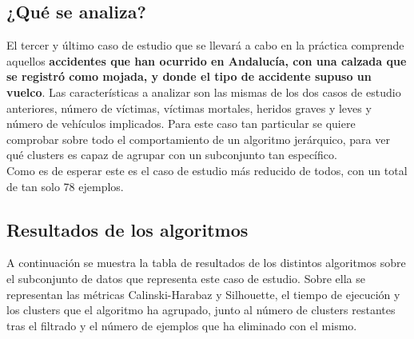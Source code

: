 	\subsection{¿Qué se analiza?}
	El tercer y último caso de estudio que se llevará a cabo en la práctica comprende aquellos \textbf{accidentes que han ocurrido en Andalucía, con una calzada que se registró como mojada, y donde el tipo de accidente supuso un vuelco}. Las características a analizar son las mismas de los dos casos de estudio anteriores, número de víctimas, víctimas mortales, heridos graves y leves y número de vehículos implicados. Para este caso tan particular se quiere comprobar sobre todo el comportamiento de un algoritmo jerárquico, para ver qué clusters es capaz de agrupar con un subconjunto tan específico.\\
	
	Como es de esperar este es el caso de estudio más reducido de todos, con un total de tan solo 78 ejemplos.
	
	\subsection{Resultados de los algoritmos}
	
	A continuación se muestra la tabla de resultados de los distintos algoritmos sobre el subconjunto de datos que representa este caso de estudio. Sobre ella se representan las métricas Calinski-Harabaz y Silhouette, el tiempo de ejecución y los clusters que el algoritmo ha agrupado, junto al número de clusters restantes tras el filtrado y el número de ejemplos que ha eliminado con el mismo.
	
	\begin{table}[H]
		\centering
		\caption{Resultados de los algoritmos de clustering para el tercer caso de estudio.}
	\end{table}

